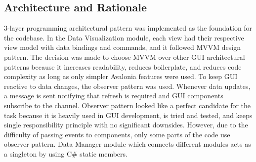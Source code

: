 \subsection*{Architecture and Rationale}
3-layer programming architectural pattern was implemented as the foundation for the codebase. In the Data Visualization module, each view had their respective view model with data bindings and commands, and it followed MVVM design pattern. The decision was made to choose MVVM over other GUI architectural patterns because it increases readability, reduces boilerplate, and reduces code complexity as long as only simpler Avalonia features were used. To keep GUI reactive to data changes, the observer pattern was used. Whenever data updates, a message is sent notifying that refresh is required and GUI components subscribe to the channel. Observer pattern looked like a perfect candidate for the task because it is heavily used in GUI development, is tried and tested, and keeps single responsibility principle with no significant downsides. However, due to the difficulty of passing events to components, only some parts of the code use observer pattern. Data Manager module which connects different modules acts as a singleton by using C\# static members.\par
